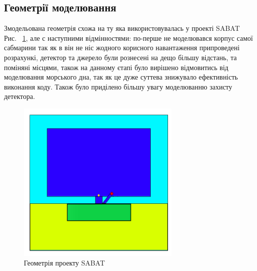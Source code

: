\documentclass[a4paper, 14pt]{article}
\numberwithin{equation}{section}
\numberwithin{table}{section}
\begin{document}
\subsection {Геометрії моделювання}
Змодельована геометрія схожа на ту яка використовувалась у проекті SABAT Рис. ~\ref{ris:SabatG}, але с наступними відмінностями: по-перше не моделювався корпус самої сабмарини так як в він не ніс жодного корисного навантаження припроведені розрахункі, детектор та джерело були рознесені на дещо більшу відстань, та поміняні місцями, також на данному єтапі було вирішено відмовитись від моделювання морського дна, так як це дуже суттева знижувало ефективність виконання коду. Також було приділено більшу увагу моделюванню захисту детектора.
\begin{figure}[hbt!]
	\centering \includegraphics[width=0.7\textwidth]{images/sabatGeometry.png}
	\caption{Геометрія проекту SABAT} 
	\label{ris:SabatG}	
\end{figure}
\end{document}

